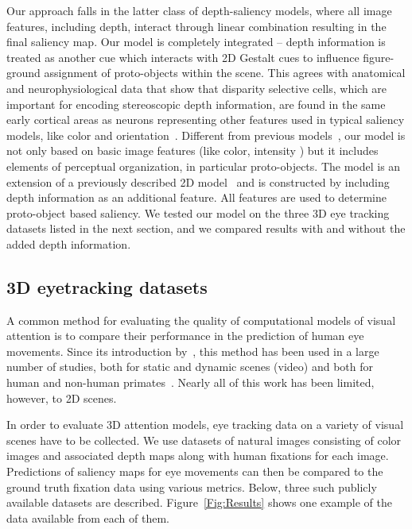 Our approach falls in the latter class of depth-saliency models, where all image features, including depth, interact through linear combination resulting in the final saliency map. Our model is completely integrated -- depth information is treated as another cue which interacts with 2D Gestalt cues to influence figure-ground assignment of proto-objects within the scene. This agrees with anatomical and neurophysiological data that show that disparity selective cells, which are important for encoding stereoscopic depth information, are found in the same early cortical areas as neurons representing other features used in typical saliency models, like color and orientation~\citep{Hubel_Wiesel62,Poggio_etal88b}. Different
from previous models~\citep{Ouerhani_etal00,Jost_etal04,Hugli_etal05}, our model is not only based on basic image features (like color, intensity \etc) but it includes elements of perceptual organization, in particular proto-objects. The model is an extension of a previously described 2D model~\citep{Russell_etal14} and is constructed by including depth information as an additional feature. All features are used to determine proto-object based saliency. We tested our model on the three 3D eye tracking datasets listed in the next section, and we compared results with and without the added depth information.

\subsection{3D eyetracking datasets}

A common method for evaluating the quality of computational models of visual attention is to compare their performance in the prediction of human eye movements. Since its introduction by~\cite{Parkhurst_etal02a}, this method has been used in a large number of studies, both for static and dynamic scenes (video) and both for human and non-human primates~\citep[for a recent review see][]{Borji_Itti13}. Nearly all of this work has been limited, however, to 2D scenes.

In order to evaluate 3D attention models, eye tracking data on a variety of visual scenes have to be collected. We use datasets of natural images consisting of color images and associated depth maps along with human fixations for each image.  Predictions of saliency maps for eye movements can then be compared to the ground truth fixation data using various metrics. Below, three such publicly available datasets are described. Figure~\ref{Fig:Results} shows one example of the data available from each of them. 


